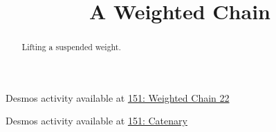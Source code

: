 \documentclass{ximera}
\title{A Weighted Chain}
\begin{document}
\begin{abstract}
Lifting a suspended weight.
\end{abstract}
\maketitle


\begin{question}  \label{Q:LMMN89}

\begin{onlineOnly}
    \begin{center}
\end{center}
\end{onlineOnly}

Desmos activity available at \href{https://www.desmos.com/calculator/ktbafmcs2r}{151: Weighted Chain 22} 


\end{question}


\begin{question}  \label{Q:DFDFGGtg}

\begin{onlineOnly}
    \begin{center}
\end{center}
\end{onlineOnly}

Desmos activity available at \href{https://www.desmos.com/calculator/sv70z21j2j}{151: Catenary}

\end{question}
\end{document}
